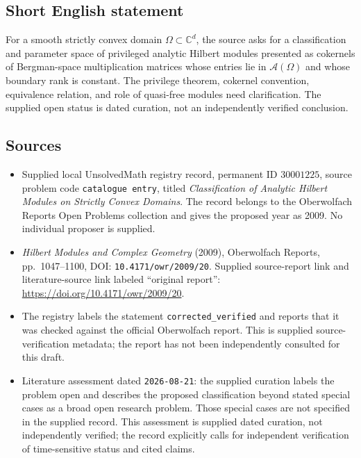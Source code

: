\documentclass[11pt]{article}
\newcommand{\C}{\mathbb{C}}
\begin{document}
\subsection{Short English statement}
For a smooth strictly convex domain \(\Omega\subset\C^d\), the source asks for a classification and parameter space of privileged analytic Hilbert modules presented as cokernels of Bergman-space multiplication matrices whose entries lie in \(\mathcal A(\Omega)\) and whose boundary rank is constant. The privilege theorem, cokernel convention, equivalence relation, and role of quasi-free modules need clarification. The supplied open status is dated curation, not an independently verified conclusion.
\subsection{Sources}
\begin{itemize}
\item Supplied local UnsolvedMath registry record, permanent ID \(30001225\), source problem code \texttt{catalogue entry}, titled \emph{Classification of Analytic Hilbert Modules on Strictly Convex Domains}. The record belongs to the Oberwolfach Reports Open Problems collection and gives the proposed year as 2009. No individual proposer is supplied.
\item \emph{Hilbert Modules and Complex Geometry} (2009), Oberwolfach Reports, pp.~1047--1100, DOI: \texttt{10.4171/owr/2009/20}. Supplied source-report link and literature-source link labeled ``original report'': \url{https://doi.org/10.4171/owr/2009/20}.
\item The registry labels the statement \texttt{corrected\_verified} and reports that it was checked against the official Oberwolfach report. This is supplied source-verification metadata; the report has not been independently consulted for this draft.
\item Literature assessment dated \texttt{2026-08-21}: the supplied curation labels the problem open and describes the proposed classification beyond stated special cases as a broad open research problem. Those special cases are not specified in the supplied record. This assessment is supplied dated curation, not independently verified; the record explicitly calls for independent verification of time-sensitive status and cited claims.
\end{itemize}
\end{document}
